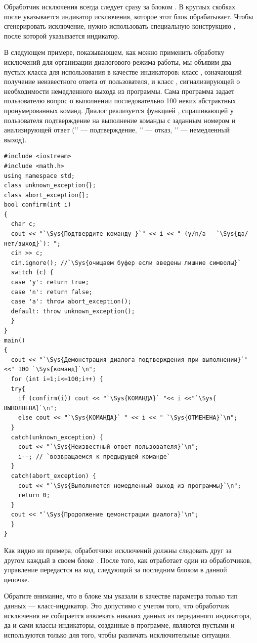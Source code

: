 Обработчик исключения всегда следует сразу за блоком . В круглых скобках после
 указывается индикатор исключения, которое этот блок обрабатывает. Чтобы сгенерировать
исключение, нужно использовать специальную конструкцию , после которой указывается
индикатор. 

В следующем примере, показывающем, как можно применить обработку исключений для организации диалогового режима работы,
мы объявим два пустых класса для использования в качестве индикаторов: класс ,
означающий получение неизвестного ответа от пользователя, и класс ,
сигнализирующей о необходимости немедленного выхода из программы.  Сама программа задает пользователю вопрос о
выполнении последовательно 100 неких абстрактных пронумерованных команд. Диалог реализуется функцией
, спрашивающей у пользователя подтверждение на выполнение команды с заданным номером и
анализирующей ответ ('' --- подтверждение, '' --- отказ,
'' --- немедленный выход).
\begin{lstlisting}
#include <iostream>
#include <math.h>
using namespace std;
class unknown_exception{};
class abort_exception{};
bool confirm(int i) 
{
  char c;
  cout << "`\Sys{Подтвердите команду }`" << i << " (y/n/a - `\Sys{да/нет/выход}`): ";
  cin >> c;
  cin.ignore(); //`\Sys{очищаем буфер если введены лишние символы}`
  switch (c) {
  case 'y': return true;
  case 'n': return false;
  case 'a': throw abort_exception();
  default: throw unknown_exception();
  }
}
main() 
{
  cout << "`\Sys{Демонстрация диалога подтверждения при выполнении}`"<<" 100 `\Sys{команд}`\n";
  for (int i=1;i<=100;i++) {
  try{ 
    if (confirm(i)) cout << "`\Sys{КОМАНДА}` "<< i <<"`\Sys{ ВЫПОЛНЕНА}`\n";
    else cout << "`\Sys{КОМАНДА}` " << i << " `\Sys{ОТМЕНЕНА}`\n";
  }
  catch(unknown_exception) {
    cout << "`\Sys{Неизвестный ответ пользователя}`\n";
    i--; // `возвращаемся к предыдущей команде`
  }
  catch(abort_exception) {
    cout << "`\Sys{Выполняется немедленный выход из программы}`\n";
    return 0;
  }
  cout << "`\Sys{Продолжение демонстрации диалога}`\n";
  }
}
\end{lstlisting}

Как видно из примера, обработчики исключений должны следовать друг за другом каждый в своем блоке
. После того, как отработает один из обработчиков, управление  передастся на код,
следующий за последним блоком  в данной цепочке.

Обратите внимание, что в блоке мы указали в качестве параметра только тип данных ---
класс-индикатор. Это допустимо с учетом того, что обработчик исключения не собирается извлекать никаких данных из
переданного индикатора, да и сами классы-индикаторы, созданные в программе, являются пустыми и используются только для
того, чтобы различать исключительные ситуации.

